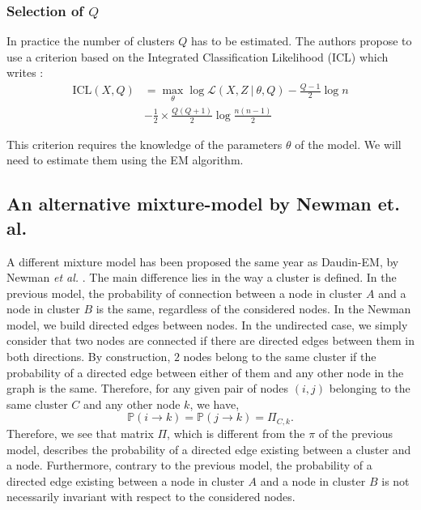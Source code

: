 \documentclass[switch, 12pt]{article}
\begin{document}
\begin{multicols}{2}
    \subsubsection{Selection of $Q$}

    In practice the number of clusters $Q$ has to be estimated. The authors propose to use a criterion based on the Integrated Classification Likelihood (ICL) which writes :
    \begin{equation}
        \begin{aligned}
            \mathrm{ICL}(X, Q) & =\max_\theta\log \mathcal{L}(X, Z \ |\ \theta, Q)-\frac{Q-1}{2}\log n \\&-\frac{1}{2}\times\frac{Q(Q+1)}{2}\log\frac{n(n-1)}{2}
        \end{aligned}
    \end{equation}

    This criterion requires the knowledge of the parameters $\theta$ of the model. We will need to estimate them using the EM algorithm.

    \subsection{An alternative mixture-model by Newman et. al. \cite{newman}}
    \label{subsec:newman}

    A different mixture model has been proposed the same year as Daudin-EM, by Newman \textit{et al.} \cite{newman}. The main difference lies in the way a cluster is defined. In the previous model, the probability of connection between a node in cluster $A$ and a node in cluster $B$ is the same, regardless of the considered nodes.
    \newline
    \newline
    In the Newman model, we build directed edges between nodes. In the undirected case, we simply consider that two nodes are connected if there are directed edges between them in both directions. By construction, $2$ nodes belong to the same cluster if the probability of a directed edge between either of them and any other node in the graph is the same. Therefore, for any given pair of nodes $(i, j)$ belonging to the same cluster $C$ and any other node $k$, we have,
    \begin{equation}
        \mathbb{P}(i \rightarrow k) = \mathbb{P}(j \rightarrow k) = \Pi_{C, k}.
    \end{equation}
    Therefore, we see that matrix $\Pi$, which is different from the $\pi$ of the previous model, describes the probability of a directed edge existing between a cluster and a node. Furthermore, contrary to the previous model, the probability of a directed edge existing between a node in cluster $A$ and a node in cluster $B$ is not necessarily invariant with respect to the considered nodes.


\end{multicols}
\end{document}
